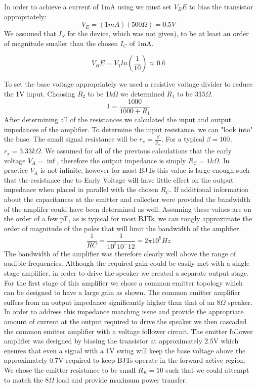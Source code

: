 \documentclass[11pt]{article}
\begin{document}
  In order to achieve a current of 1mA using we must set $V_BE$ to bias the transistor appropriately:
  $$V_E = (1mA)(500\Omega) = 0.5V$$
  We assumed that $I_S$ for the device, which was not given), to be at least an order of magnitude smaller than the chosen $I_C$ of 1mA.
  
  $$V_BE = V_T ln(\frac{1}{10}) \approx 0.6$$
  
  To set the base voltage appropriately we used a resistive voltage divider to reduce the 1V input.  Choosing $R_2$ to be 1$k\Omega$ we determined $R_1$ to be 315$\Omega$.
  $$1 = \frac{1000}{1000 + R_1}$$
  After determining all of the resistances we calculated the input and output impedances of the amplifier.
  To determine the input resistance, we can "look into" the base. The small signal resistance will be $r_{\pi}=\frac{\beta}{g_m}$.  For a typical $\beta = 100$, $r_{\pi} = 3.33k\Omega$. We assumed for all of the previous calculations that the early voltage $V_A=\inf$, therefore the output impedance is simply $R_C=1k\Omega$.  In practice $V_A$ is not infinite, however for most BJTs this value is large enough such that the resistance due to Early Voltage will have little effect on the output impedance when placed in parallel with the chosen $R_C$.
  If additional information about the capacitances at the emitter and collector were provided the bandwidth of the amplifer could have been determined as well. Assuming these values are on the order of a few pF, as is typical for most BJTs, we can rougly approximate the order of magnitude of the poles that will limit the bandwidth of the amplifier.
  $$\frac{1}{RC}=\frac{1}{10^3 10^-12}= 2\pi 10^9 Hz$$
  The bandwidth of the amplifier was therefore clearly well above the range of audible frequencies.
  Although the required gain could be easily met with a single stage amplifier, in order to drive the speaker we created a separate output stage.  For the first stage of this amplifier we chose a common emitter topology which can be designed to have a large gain as shown.  The common emitter amplifier suffers from an output impedance significantly higher than that of an 8$\Omega$ speaker.  In order to address this impedance matching issue and provide the appropriate amount of current at the output required to drive the speaker we then cascaded the common emitter amplifier with a voltage follower circuit. 
  The emitter follower amplifier was designed by biasing the transistor at approximately 2.5V which ensures that even a signal with a 1V swing will keep the base voltage above the approximately 0.7V required to keep BJTs operate in the forward active region. We chose the emitter resistance to be small $R_E = 10$ such that we could attempt to match the 8$\Omega$ load and provide maximum power transfer.
  
\end{document}
